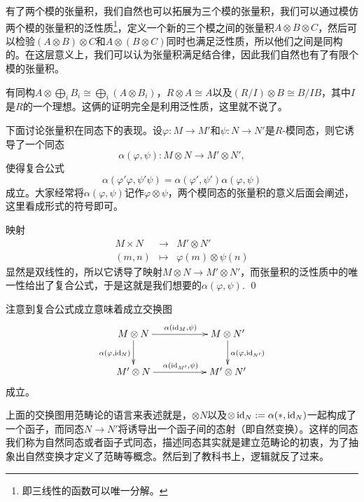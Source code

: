 
\para 有了两个模的张量积，我们自然也可以拓展为三个模的张量积，我们可以通过模仿两个模的张量积的泛性质\footnote{即三线性的函数可以唯一分解。}，定义一个新的三个模之间的张量积$A\otimes B\otimes C$，然后可以检验$(A\otimes B)\otimes C$和$A\otimes (B\otimes C)$同时也满足泛性质，所以他们之间是同构的。在这层意义上，我们可以认为张量积满足结合律，因此我们自然也有了有限个模的张量积。

\para 有同构$A\otimes\bigoplus_i B_i\cong \bigoplus_i (A\otimes B_i)$，$R\otimes A\cong A$以及$(R/I)\otimes B\cong B/IB$，其中$I$是$R$的一个理想。这俩的证明完全是利用泛性质，这里就不说了。

\para 下面讨论张量积在同态下的表现。设$\varphi:M\to M'$和$\psi:N\to N'$是$R$-模同态，则它诱导了一个同态
\[
	\alpha(\varphi,\psi):M\otimes N\to M'\otimes N',
\]
使得复合公式
\[
	\alpha(\varphi'\varphi,\psi'\psi)=\alpha(\varphi',\psi')\alpha(\varphi,\psi)
\]
成立。大家经常将$\alpha(\varphi,\psi)$记作$\varphi\otimes \psi$，两个模同态的张量积的意义后面会阐述，这里看成形式的符号即可。

\proof
	映射
	\[
	\begin{array}{ccc}
		M\times N&\to& M'\otimes N'\\
		(m,n)&\mapsto& \varphi(m)\otimes \psi(n)
	\end{array}
	\]
	显然是双线性的，所以它诱导了映射$M\otimes N\to M'\otimes N'$，而张量积的泛性质中的唯一性给出了复合公式，于是这就是我们想要的$\alpha(\varphi,\psi)$.
\qed

注意到复合公式成立意味着成立交换图
\[
\begin{xy}
	\xymatrix
	{
		M\otimes N\ar[rr]^{\alpha(\id_M,\psi)}\ar[d]_{\alpha(\varphi,\id_{N})}&&M\otimes N'\ar[d]^{\alpha(\varphi,\id_{N'})}\\
		M'\otimes N\ar[rr]^{\alpha(\id_{M'},\psi)}&&M'\otimes N'
	}
\end{xy}
\]
成立。

上面的交换图用范畴论的语言来表述就是，$\otimes N$以及$\otimes \operatorname{id}_N:=\alpha(*,\operatorname{id}_N)$一起构成了一个函子，而同态$N\to N'$将诱导出一个函子间的态射（即自然变换）。这样的同态我们称为自然同态或者函子式同态，描述同态其实就是建立范畴论的初衷，为了抽象出自然变换才定义了范畴等概念。然后到了教科书上，逻辑就反了过来。

